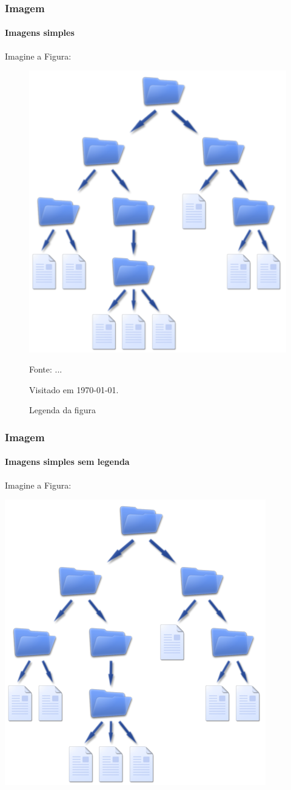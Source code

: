 \documentclass[aspectratio=169]{beamer}
\begin{document}
	\begin{frame}
		\frametitle{Imagem}
		\framesubtitle{Imagens simples}
		Imagine a Figura:
		
		\begin{figure}
			\centering
			\caption{Legenda da figura}
			
			\includegraphics[width=.25\linewidth]{sa.png} 
			
			\footnotesize{Fonte: ...	
				\par Visitado em \today.}
			\label{im1}
		\end{figure}	
	\end{frame}
	
	\begin{frame}
		\frametitle{Imagem}
		\framesubtitle{Imagens simples sem legenda}
			Imagine a Figura:
		
			\center
			\includegraphics[width=.25\linewidth]{sa.png} 	
	\end{frame}
	
\end{document}
